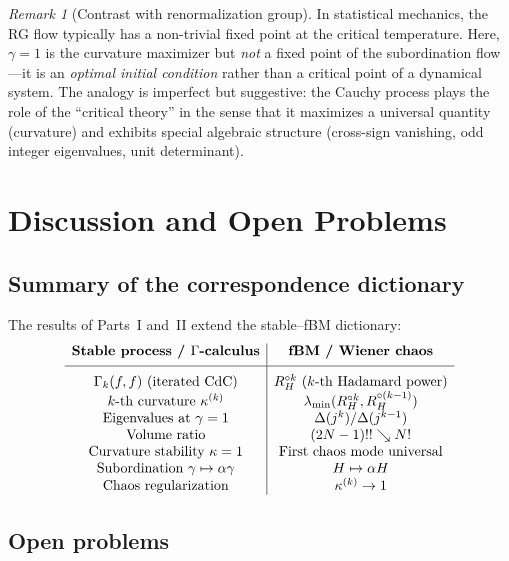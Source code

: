 \documentclass[11pt,a4paper]{article}
\theoremstyle{plain}
\theoremstyle{definition}
\theoremstyle{remark}
\newtheorem{remark}[theorem]{Remark}
\begin{document}
\begin{remark}[Contrast with renormalization group]
\label{rem:RG}
In statistical mechanics, the RG flow typically has a
non-trivial fixed point at the critical temperature.
Here, $\gamma = 1$ is the curvature maximizer but \emph{not}
a fixed point of the subordination flow---it is an
\emph{optimal initial condition} rather than a critical point
of a dynamical system.
The analogy is imperfect but suggestive: the Cauchy process
plays the role of the ``critical theory'' in the sense that
it maximizes a universal quantity (curvature) and exhibits
special algebraic structure (cross-sign vanishing, odd integer
eigenvalues, unit determinant).
\end{remark}


\section{Discussion and Open Problems}\label{sec:discussion}

\subsection{Summary of the correspondence dictionary}

The results of Parts~I and~II extend the stable--fBM
dictionary:
\[
\begin{array}{c|c}
\textbf{Stable process / $\Gamma$-calculus}
& \textbf{fBM / Wiener chaos} \\[4pt]
\hline
\rule{0pt}{14pt}
\Gamma_k(f,f) \text{ (iterated CdC)}
  & R_H^{\circ k} \text{ ($k$-th Hadamard power)} \\
\text{$k$-th curvature } \kappa^{(k)}
  & \lambda_{\min}(R_H^{\circ k}, R_H^{\circ(k-1)}) \\
\text{Eigenvalues at } \gamma = 1
  & \Delta(j^k)/\Delta(j^{k-1}) \\
\text{Volume ratio}
  & (2N-1)!! \searrow N! \\
\text{Curvature stability } \kappa = 1
  & \text{First chaos mode universal} \\
\text{Subordination } \gamma \mapsto \alpha\gamma
  & H \mapsto \alpha H \\
\text{Chaos regularization}
  & \kappa^{(k)} \to 1
\end{array}
\]


\subsection{Open problems}
\end{document}
